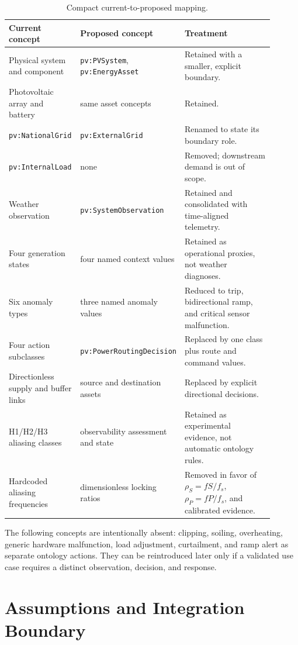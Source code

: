 \documentclass[
	letterpaper,
	10pt,
	unnumberedsections,
	twoside,
]{LTJournalArticle}
\newcommand{\pv}[1]{\texttt{pv:#1}}
\begin{document}
\begin{table}[htbp]
\centering
\caption{Compact current-to-proposed mapping.}
\label{tab:migration}
\small
\begin{tabular}{@{}L{0.27\linewidth}L{0.27\linewidth}L{0.36\linewidth}@{}}
\toprule
\textbf{Current concept} & \textbf{Proposed concept} & \textbf{Treatment} \\
\midrule
Physical system and component & \pv{PVSystem}, \pv{EnergyAsset} & Retained with a smaller, explicit boundary. \\
Photovoltaic array and battery & same asset concepts & Retained. \\
\pv{NationalGrid} & \pv{ExternalGrid} & Renamed to state its boundary role. \\
\pv{InternalLoad} & none & Removed; downstream demand is out of scope. \\
Weather observation & \pv{SystemObservation} & Retained and consolidated with time-aligned telemetry. \\
Four generation states & four named context values & Retained as operational proxies, not weather diagnoses. \\
Six anomaly types & three named anomaly values & Reduced to trip, bidirectional ramp, and critical sensor malfunction. \\
Four action subclasses & \pv{PowerRoutingDecision} & Replaced by one class plus route and command values. \\
Directionless supply and buffer links & source and destination assets & Replaced by explicit directional decisions. \\
H1/H2/H3 aliasing classes & observability assessment and state & Retained as experimental evidence, not automatic ontology rules. \\
Hardcoded aliasing frequencies & dimensionless locking ratios & Removed in favor of $\rho_S=fS/f_s$, $\rho_P=fP/f_s$, and calibrated evidence. \\
\bottomrule
\end{tabular}
\end{table}

The following concepts are intentionally absent: clipping, soiling, overheating, generic hardware malfunction, load adjustment, curtailment, and ramp alert as separate ontology actions. They can be reintroduced later only if a validated use case requires a distinct observation, decision, and response.

\section{Assumptions and Integration Boundary}
\end{document}

